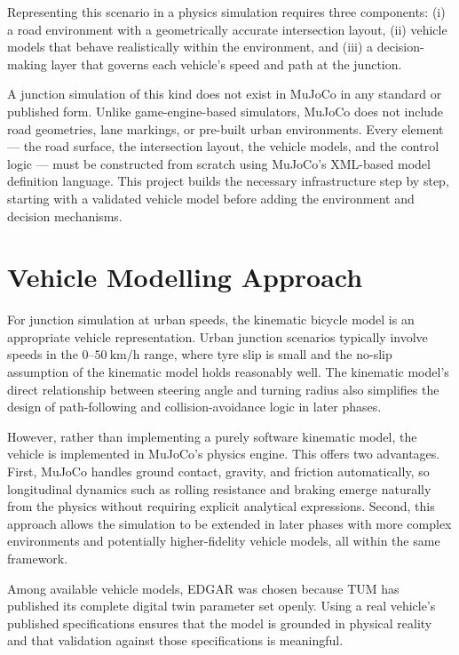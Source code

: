 \documentclass[a4paper,12pt]{report}
\begin{document}
Representing this scenario in a physics simulation requires three components:
(i) a road environment with a geometrically accurate intersection layout,
(ii) vehicle models that behave realistically within the environment, and
(iii) a decision-making layer that governs each vehicle's speed and path at
the junction.

A junction simulation of this kind does not exist in MuJoCo in any standard
or published form. Unlike game-engine-based simulators, MuJoCo does not include
road geometries, lane markings, or pre-built urban environments. Every element
— the road surface, the intersection layout, the vehicle models, and the control
logic — must be constructed from scratch using MuJoCo's XML-based model
definition language. This project builds the necessary infrastructure step by
step, starting with a validated vehicle model before adding the environment and
decision mechanisms.

\section{Vehicle Modelling Approach}

For junction simulation at urban speeds, the kinematic bicycle model is an
appropriate vehicle representation. Urban junction scenarios typically involve
speeds in the $0$–$50\ \text{km/h}$ range, where tyre slip is small and the
no-slip assumption of the kinematic model holds reasonably well. The kinematic
model's direct relationship between steering angle and turning radius also
simplifies the design of path-following and collision-avoidance logic in later
phases.

However, rather than implementing a purely software kinematic model, the vehicle
is implemented in MuJoCo's physics engine. This offers two advantages. First,
MuJoCo handles ground contact, gravity, and friction automatically, so
longitudinal dynamics such as rolling resistance and braking emerge naturally
from the physics without requiring explicit analytical expressions. Second, this
approach allows the simulation to be extended in later phases with more complex
environments and potentially higher-fidelity vehicle models, all within the
same framework.

Among available vehicle models, EDGAR was chosen because TUM has published its
complete digital twin parameter set openly. Using a real vehicle's published
specifications ensures that the model is grounded in physical reality and that
validation against those specifications is meaningful.
\end{document}

